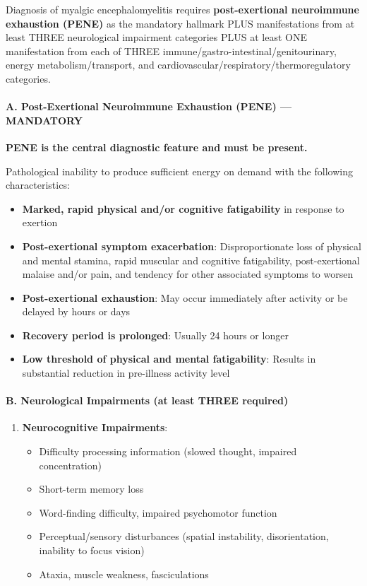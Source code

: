 \begin{requirement}
\label{req:icc}
Diagnosis of myalgic encephalomyelitis requires \textbf{post-exertional neuroimmune exhaustion (PENE)} as the mandatory hallmark PLUS manifestations from at least THREE neurological impairment categories PLUS at least ONE manifestation from each of THREE immune/gastro-intestinal/genitourinary, energy metabolism/transport, and cardiovascular/respiratory/thermoregulatory categories.

\paragraph{A. Post-Exertional Neuroimmune Exhaustion (PENE) --- MANDATORY}

\textbf{PENE is the central diagnostic feature and must be present.}

Pathological inability to produce sufficient energy on demand with the following characteristics:
\begin{itemize}
    \item \textbf{Marked, rapid physical and/or cognitive fatigability} in response to exertion
    \item \textbf{Post-exertional symptom exacerbation}: Disproportionate loss of physical and mental stamina, rapid muscular and cognitive fatigability, post-exertional malaise and/or pain, and tendency for other associated symptoms to worsen
    \item \textbf{Post-exertional exhaustion}: May occur immediately after activity or be delayed by hours or days
    \item \textbf{Recovery period is prolonged}: Usually 24 hours or longer
    \item \textbf{Low threshold of physical and mental fatigability}: Results in substantial reduction in pre-illness activity level
\end{itemize}

\paragraph{B. Neurological Impairments (at least THREE required)}

\begin{enumerate}
    \item \textbf{Neurocognitive Impairments}:
    \begin{itemize}
        \item Difficulty processing information (slowed thought, impaired concentration)
        \item Short-term memory loss
        \item Word-finding difficulty, impaired psychomotor function
        \item Perceptual/sensory disturbances (spatial instability, disorientation, inability to focus vision)
        \item Ataxia, muscle weakness, fasciculations
    \end{itemize}


\end{enumerate}
\end{requirement}
